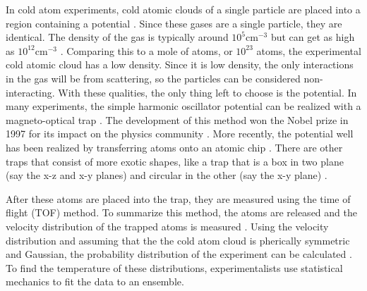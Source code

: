 In cold atom experiments, cold atomic clouds of a single particle are placed into a region containing a potential \cite{Bhar}. Since these gases are a single particle, they are identical. The density of the gas is typically around $10^5 \text{cm}^{-3}$ \cite{Viering} but can get as high as $10^{12} \text{cm}^{-3}$ \cite{Radwell}. Comparing this to a mole of atoms, or $10^{23}$ atoms, the experimental cold atomic cloud has a low density. Since it is low density, the only interactions in the gas will be from scattering, so the particles can be considered non-interacting. With these qualities, the only thing left to choose is the potential. In many experiments, the simple harmonic oscillator potential can be realized with a magneto-optical trap \cite{Radwell,Phillips_1998,Viering,Bhar}. The development of this method won the Nobel prize in 1997 for its impact on the physics community \cite{nobelprize.org_1997}. More recently, the potential well has been realized by transferring atoms onto an atomic chip \cite{Es2010}. There are other traps that consist of more exotic shapes, like a trap that is a box in two plane (say the x-z and x-y planes) and circular in the other (say the x-y plane) \cite{Mukherjee2017}. 

After these atoms are placed into the trap, they are measured using the time of flight (TOF) method. To summarize this method, the atoms are released and the velocity distribution of the trapped atoms is measured \cite{Brzozowski,Wheeler_2003}. Using the velocity distribution and assuming that the the cold atom cloud is pherically symmetric and Gaussian, the probability distribution of the experiment can be calculated \cite{Brzozowski}. To find the temperature of these distributions, experimentalists use statistical mechanics to fit the data to an ensemble. 


